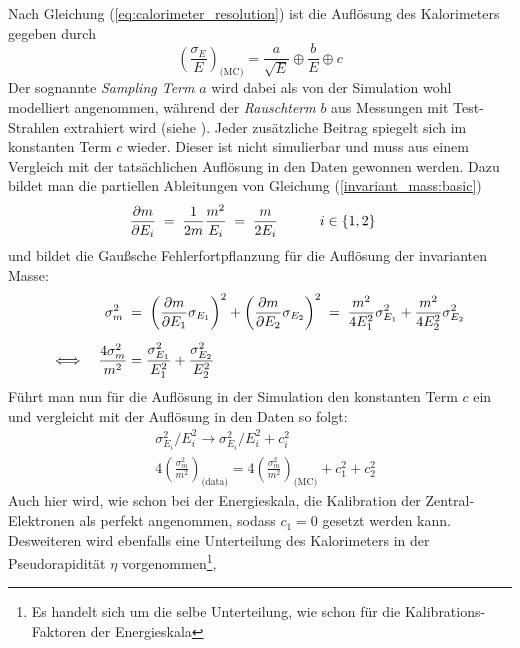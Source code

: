 Nach Gleichung (\ref{eq:calorimeter_resolution}) ist die Auflösung des
Kalorimeters gegeben durch 
\begin{equation}
    \left(\frac{\sigma_E}{E}\right)_\text{(MC)} =
        \frac{a}{\sqrt{E}} \oplus \frac{b}{E} \oplus c
\end{equation}
Der sognannte \textit{Sampling Term} $a$ wird dabei als von der Simulation
wohl modelliert angenommen, während der \textit{Rauschterm} $b$ aus Messungen
mit Test-Strahlen extrahiert wird (siehe \cite{1748-0221-5-11-P11006}). Jeder
zusätzliche Beitrag spiegelt sich im konstanten Term $c$ wieder. Dieser ist
nicht simulierbar und muss aus einem Vergleich mit der tatsächlichen Auflösung
in den Daten gewonnen werden. Dazu bildet man die partiellen Ableitungen von
Gleichung (\ref{invariant_mass:basic})
\begin{align}
    \frac{\partial m}{\partial E_i} \;&=\; \frac{1}{2m} \frac{m^2}{E_i}
        \;=\; \frac{m}{2 E_i} \qquad\quad i \in \{1,2\}
\end{align}
und bildet die Gaußsche Fehlerfortpflanzung für die Auflösung der invarianten
Masse:
\begin{align}
    \sigma_m^2 \;&=\; \left(\frac{\partial m}{\partial E_1}\sigma_{E_1}\right)^2 +
                      \left(\frac{\partial m}{\partial E_2}\sigma_{E_2}\right)^2
                \;=\; \frac{m^2}{4E_1^2}\sigma_{E_1}^2 +
                      \frac{m^2}{4E_2^2}\sigma_{E_2}^2
                      \nonumber \\[5pt]
    \Longleftrightarrow \quad
    \frac{4\sigma_m^2}{m^2} &= \frac{\sigma_{E_1}^2}{E_1^2} +
                               \frac{\sigma_{E_2}^2}{E_2^2}
\end{align}
Führt man nun für die Auflösung in der Simulation den konstanten Term $c$ ein
und vergleicht mit der Auflösung in den Daten so folgt:
\begin{align}
    &\sigma_{E_i}^2/E_i^2 \longrightarrow \sigma_{E_i}^2/E_i^2 + c_i^2
    \nonumber \\[10pt]
    &4\left(\frac{\sigma_m^2}{m^2}\right)_\text{(data)}
        = 4\left(\frac{\sigma_m^2}{m^2}\right)_\text{(MC)}
        + c_1^2 + c_2^2
\end{align}
Auch hier wird, wie schon bei der Energieskala, die Kalibration der
Zentral-Elektronen als perfekt angenommen, sodass $c_1 = 0$ gesetzt werden
kann. Desweiteren wird ebenfalls eine Unterteilung des Kalorimeters in der
Pseudorapidität $\eta$ vorgenommen\footnote{Es handelt sich um die selbe
Unterteilung, wie schon für die Kalibrations-Faktoren der Energieskala},
